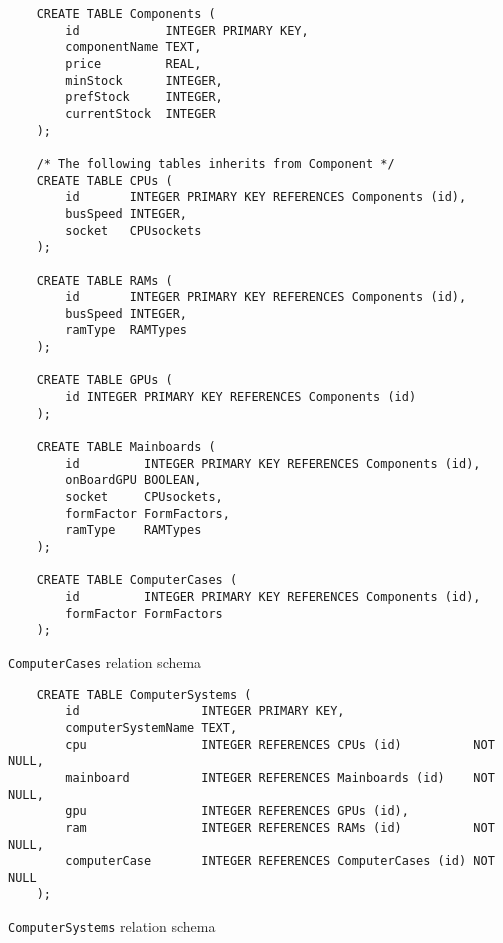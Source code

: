 \documentclass[12pt,a4paper]{article}
\begin{document}
\begin{listing}[!htbp]
    \begin{verbatim}
    CREATE TABLE Components (
        id            INTEGER PRIMARY KEY,
        componentName TEXT,
        price         REAL,
        minStock      INTEGER,
        prefStock     INTEGER,
        currentStock  INTEGER
    );
    
    /* The following tables inherits from Component */
    CREATE TABLE CPUs (
        id       INTEGER PRIMARY KEY REFERENCES Components (id),
        busSpeed INTEGER,
        socket   CPUsockets
    );
    
    CREATE TABLE RAMs (
        id       INTEGER PRIMARY KEY REFERENCES Components (id),
        busSpeed INTEGER,
        ramType  RAMTypes
    );
    
    CREATE TABLE GPUs (
        id INTEGER PRIMARY KEY REFERENCES Components (id)
    );
    
    CREATE TABLE Mainboards (
        id         INTEGER PRIMARY KEY REFERENCES Components (id),
        onBoardGPU BOOLEAN,
        socket     CPUsockets,
        formFactor FormFactors,
        ramType    RAMTypes
    );
    
    CREATE TABLE ComputerCases (
        id         INTEGER PRIMARY KEY REFERENCES Components (id),
        formFactor FormFactors
    );
    \end{verbatim}
    \caption{\texttt{ComputerCases} relation schema}
    \label{lst:CaseRelation}
\end{listing}

\begin{listing}[!htbp]
    \begin{verbatim}
    CREATE TABLE ComputerSystems (
        id                 INTEGER PRIMARY KEY,
        computerSystemName TEXT,
        cpu                INTEGER REFERENCES CPUs (id)          NOT NULL,
        mainboard          INTEGER REFERENCES Mainboards (id)    NOT NULL,
        gpu                INTEGER REFERENCES GPUs (id),
        ram                INTEGER REFERENCES RAMs (id)          NOT NULL,
        computerCase       INTEGER REFERENCES ComputerCases (id) NOT NULL
    );
    \end{verbatim}
    \caption{\texttt{ComputerSystems} relation schema}
    \label{lst:computersystem}
\end{listing}
\end{document}
